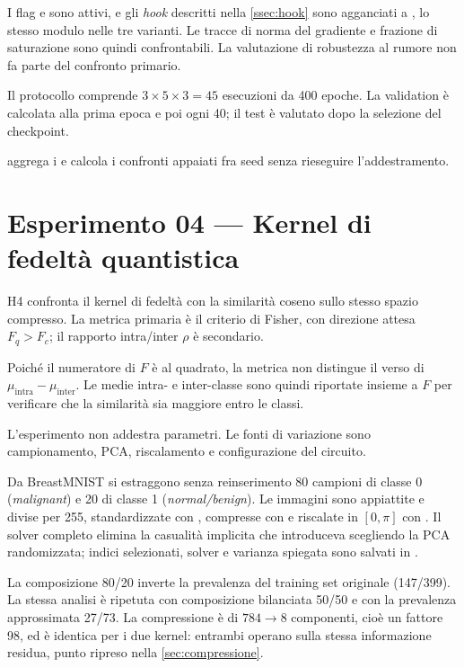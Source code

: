 I flag  e  sono attivi, e gli
\emph{hook} descritti nella \cref{ssec:hook} sono agganciati a
, lo stesso modulo nelle tre varianti. Le tracce di
norma del gradiente e frazione di saturazione sono quindi confrontabili. La
valutazione di robustezza al rumore non fa parte del confronto primario.

Il protocollo comprende $3 \times 5 \times 3 = 45$ esecuzioni da 400 epoche. La
validation è calcolata alla prima epoca e poi ogni 40; il test è valutato dopo la
selezione del checkpoint.

 aggrega i  e calcola i confronti
appaiati fra seed senza rieseguire l'addestramento.

\section{Esperimento 04 --- Kernel di fedeltà quantistica}
\label{sec:esp-kernel}

H4 confronta il kernel di fedeltà con la similarità coseno sullo stesso spazio
compresso. La metrica primaria è il criterio di Fisher, con direzione attesa
$F_q>F_c$; il rapporto intra/inter $\rho$ è secondario.

Poiché il numeratore di $F$ è al quadrato, la metrica non distingue il verso di
$\mu_{\mathrm{intra}}-\mu_{\mathrm{inter}}$. Le medie intra- e inter-classe sono
quindi riportate insieme a $F$ per verificare che la similarità sia maggiore
entro le classi.

L'esperimento non addestra parametri. Le fonti di variazione sono campionamento,
PCA, riscalamento e configurazione del circuito.

Da BreastMNIST si estraggono senza reinserimento 80 campioni di classe 0
(\emph{malignant}) e 20 di classe 1 (\emph{normal/benign}). Le immagini sono
appiattite e divise per 255, standardizzate con , compresse
con  e riscalate in $[0,\pi]$ con
. Il solver completo elimina la casualità implicita che
 introduceva scegliendo la PCA randomizzata; indici
selezionati, solver e varianza spiegata sono salvati in .

La composizione 80/20 inverte la prevalenza del training set originale (147/399).
La stessa analisi è ripetuta con composizione bilanciata 50/50 e con la
prevalenza approssimata 27/73.
La compressione è di $784 \to 8$ componenti, cioè un fattore 98, ed è identica per
i due kernel: entrambi operano sulla stessa informazione residua, punto ripreso
nella \cref{sec:compressione}.


